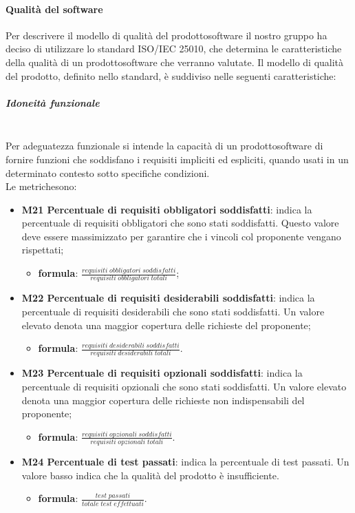 	\paragraph{Qualità del software} 
	Per descrivere il modello di qualità del prodotto\glosp software il nostro gruppo ha deciso di utilizzare lo standard ISO/IEC 25010, che determina le caratteristiche della qualità di un prodotto\glosp software che verranno valutate. Il modello di qualità del prodotto\glo, definito nello standard, è suddiviso nelle seguenti caratteristiche:
		\subparagraph{Idoneità funzionale} \mbox{}\\[1mm]
		Per adeguatezza funzionale si intende la capacità di un prodotto\glosp software di fornire funzioni che soddisfano i requisiti impliciti ed espliciti, quando usati in un determinato contesto sotto specifiche condizioni. \\
		Le metriche\glosp sono:
		\begin{itemize}
			\item \textbf{M21 Percentuale di requisiti obbligatori soddisfatti}: indica la percentuale di requisiti obbligatori che sono stati soddisfatti. Questo valore deve essere massimizzato per garantire che i vincoli col proponente vengano rispettati;
			\begin{itemize}
				\item[] \textbf{formula}: $\frac{requisiti \; obbligatori \; soddisfatti}{requisiti \; obbligatori \; totali}$;
			\end{itemize} 
			\item \textbf{M22 Percentuale di requisiti desiderabili soddisfatti}:
			indica la percentuale di requisiti desiderabili che sono stati soddisfatti. Un valore elevato denota una maggior copertura delle richieste del proponente;
			\begin{itemize}
				\item[] \textbf{formula}: $\frac{requisiti \; desiderabili \; soddisfatti}{requisiti \; desiderabili \; totali}$.
			\end{itemize} 
			\item \textbf{M23 Percentuale di requisiti opzionali soddisfatti}:
			indica la percentuale di requisiti opzionali che sono stati soddisfatti. Un valore elevato denota una maggior copertura delle richieste non indispensabili  del proponente;
			\begin{itemize}
				\item[] \textbf{formula}: $\frac{requisiti \; opzionali \; soddisfatti}{requisiti \; opzionali \; totali}$.
			\end{itemize} 
			\item \textbf{M24 Percentuale di test passati}:
			indica la percentuale di test passati. Un valore basso indica che la qualità del prodotto è insufficiente. 
			\begin{itemize}
				\item[] \textbf{formula}: $\frac{test \; passati}{totale \; test \; effettuati}$.
			\end{itemize}
		\end{itemize}
	
